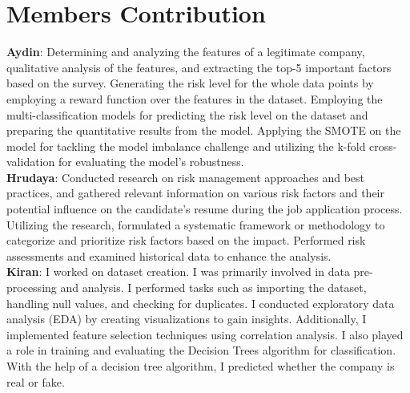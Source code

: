 \documentclass{article}
\begin{document}
\section{Members Contribution}

\textbf{Aydin}: Determining and analyzing the features of a legitimate company, qualitative analysis of the features, and extracting the top-5 important factors based on the survey. Generating the risk level for the whole data points by employing a reward function over the features in the dataset. Employing the multi-classification models for predicting the risk level on the dataset and preparing the quantitative results from the model.
Applying the SMOTE on the model for tackling the model imbalance challenge and utilizing the k-fold cross-validation for evaluating the model's robustness.
\\

\textbf{Hrudaya}: Conducted research on risk management approaches and best practices, and gathered relevant information on various risk factors and their potential influence on the candidate's resume during the job application process. Utilizing the research, formulated a systematic framework or methodology to categorize and prioritize risk factors based on the impact. Performed risk assessments and examined historical data to enhance the analysis.
\\

\textbf{Kiran}: I worked on dataset creation. I was primarily involved in data pre-processing and analysis. I performed tasks such as importing the dataset, handling null values, and checking for duplicates. I conducted exploratory data analysis (EDA) by creating visualizations to gain insights. Additionally, I implemented feature selection techniques using correlation analysis. I also played a role in training and evaluating the Decision Trees algorithm for classification. With the help of a decision tree algorithm, I predicted whether the company is real or fake. 
\end{document}
